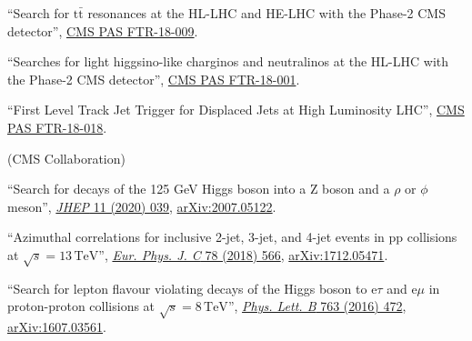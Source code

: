 \begin{description}[leftmargin=12pt,font=\normalfont\textit]
\begin{description}[leftmargin=12pt,font=\normalfont,labelsep=0em]
\item ``Search for $\text{t}\bar{\text{t}}$ resonances at the HL-LHC and HE-LHC with the Phase-2 CMS detector'', \href{https://cds.cern.ch/record/2649032}{CMS PAS FTR-18-009}.
\item ``Searches for light higgsino-like charginos and neutralinos at the HL-LHC with the Phase-2 CMS detector'', \href{https://cds.cern.ch/record/2648538}{CMS PAS FTR-18-001}.
\item ``First Level Track Jet Trigger for Displaced Jets at High Luminosity LHC'', \href{https://cds.cern.ch/record/2647987}{CMS PAS FTR-18-018}.
\end{description}
\item[FNAL institutional review leader:] (CMS Collaboration)
\begin{description}[leftmargin=12pt,font=\normalfont,labelsep=0em]
\item ``Search for decays of the 125 GeV Higgs boson into a Z boson and a $\rho$ or $\phi$ meson'', \href{https://doi.org/10.1007/JHEP11(2020)039}{\emph{JHEP} 11 (2020) 039}, \href{https://arxiv.org/abs/2007.05122}{arXiv:2007.05122}.
\item ``Azimuthal correlations for inclusive 2-jet, 3-jet, and 4-jet events in pp collisions at $\sqrt{s} = 13\,\text{TeV}$'', \href{http://dx.doi.org/10.1140/epjc/s10052-018-6033-4}{\emph{Eur. Phys. J. C} 78 (2018) 566}, \href{http://arxiv.org/abs/1712.05471}{arXiv:1712.05471}.
\item ``Search for lepton flavour violating decays of the Higgs boson to e$\tau$ and e$\mu$ in proton-proton collisions at $\sqrt{s} = 8\,\text{TeV}$'', \href{http://dx.doi.org/10.1016/j.physletb.2016.09.062}{\emph{Phys. Lett. B} 763 (2016) 472}, \href{http://arxiv.org/abs/1607.03561}{arXiv:1607.03561}.
\end{description}
\end{description}